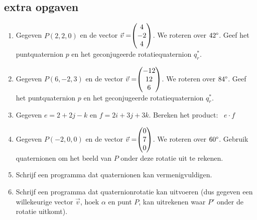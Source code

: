 \subsection{extra opgaven}
\begin{enumerate}
    \setlength{\itemsep}{10pt}
	\item Gegeven $P (2,2,0)$ en de vector $\vec{v} = \vecdrie{4}{-2}{4} $. 
	We roteren over $42\degree$. Geef het puntquaternion $p$ en het geconjugeerde rotatiequaternion $q_r^*$. 
	
	\item Gegeven $ P (6,-2,3)$ en de vector $\vec{v} = \vecdrie{-12}{12}{6} $. 
	We roteren over $ 84\degree$. Geef het puntquaternion $p$ en het geconjugeerde rotatiequaternion  $q_r^*$. 
	
	\item Gegeven $e = 2 +2j-k$ en $f = 2i+3j+3k$. Bereken het product: \ $e\cdot f$
	
	\item  Gegeven $P (-2, 0, 0)$ en de vector $\vec{v} = \vecdrie{0}{7}{0} $. 
	We roteren over $60\degree$. Gebruik quaternionen om het beeld van $P$ onder deze rotatie uit te rekenen. 
	
	\item Schrijf een programma dat quaternionen kan vermenigvuldigen.  
	
	\item Schrijf een programma dat quaternionrotatie kan uitvoeren (dus gegeven een willekeurige vector $\vec{v}$, hoek $\alpha$ en punt $P$, kan uitrekenen waar $P'$ onder de rotatie uitkomt).  
\end{enumerate}
